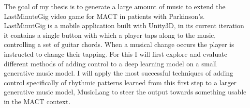 The goal of my thesis is to generate a large amount of music to extend the LastMinuteGig video game for MACT in patients with Parkinson's. LastMinutGig is a mobile application built with Unity3D, in its current iteration it contains a single button with which a player taps along to the music, controlling a set of guitar chords. When a musical change occurs the player is instructed to change their tapping. For this I will first explore and evaluate different methods of adding control to a deep learning model on a small generative music model. I will apply the most successful techniques of adding control specifically of rhythmic patterns learned from this first step to a larger generative music model, MusicLang to steer the output towards something usable in the MACT context. 
